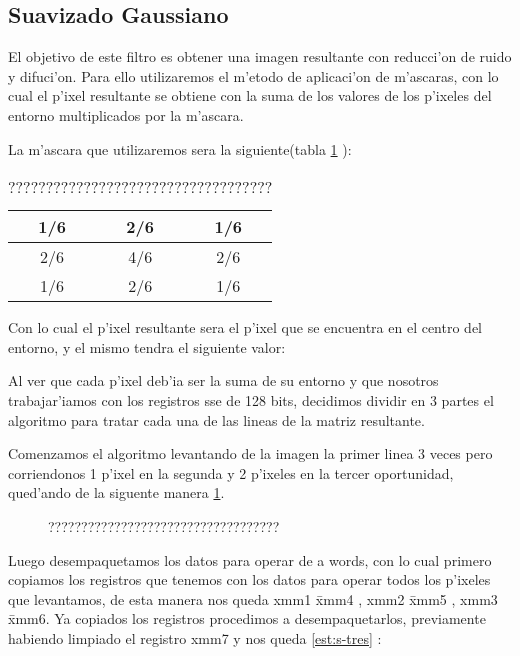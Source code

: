 \subsection{Suavizado Gaussiano}
El objetivo de este filtro es obtener una imagen resultante con reducci'on de ruido y difuci'on. 
Para ello utilizaremos el m'etodo de aplicaci'on de m'ascaras, con lo cual el p'ixel resultante se obtiene con la suma
de los valores de los p'ixeles del entorno multiplicados por la m'ascara.

La m'ascara que utilizaremos sera la siguiente(tabla \ref{tab:s-uno} ):

\begin{table}[h!]
\begin{center}
\begin{tabular}{| c | c | c |}
\hline
1/6 & 2/6 & 1/6 \\ \hline
2/6 & 4/6 & 2/6 \\ \hline
1/6 & 2/6 & 1/6 \\ \hline
\end{tabular}
\end{center}
\caption{???????????????????????????????????}
\label{tab:s-uno}
\end{table}

Con lo cual el p'ixel resultante sera el p'ixel que se encuentra en el centro del entorno, y el mismo tendra el siguiente valor:

Al ver que cada p'ixel deb'ia ser la suma de su entorno y que nosotros trabajar'iamos con los registros sse de 128 bits, decidimos 
dividir en 3 partes el algoritmo para tratar cada una de las lineas de la matriz resultante.

Comenzamos el algoritmo levantando de la imagen la primer linea 3 veces pero corriendonos 1 p'ixel en la segunda y 2 p'ixeles en la 
tercer oportunidad, qued'ando de la siguente manera \ref{est:s-dos}.

\begin{figure}[h!]
\caption{???????????????????????????????????}
\label{est:s-dos}
\end{figure}

Luego desempaquetamos los datos para operar de a words, con lo cual primero copiamos los registros que tenemos con los datos para operar todos los p'ixeles que levantamos, de esta manera nos queda xmm1 \= xmm4 , xmm2 \= xmm5 , xmm3 \= xmm6.
Ya copiados los registros procedimos a desempaquetarlos, previamente habiendo limpiado el registro xmm7 y nos queda \ref{est:s-tres} :

